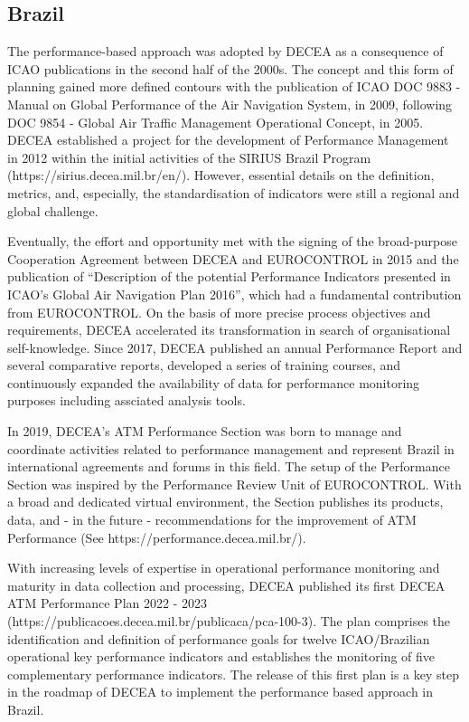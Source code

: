 \documentclass[
  a4paper,
  DIV=11,
  numbers=noendperiod]{scrreprt}
\begin{document}
\hypertarget{brazil}{%
\subsection{Brazil}\label{brazil}}

The performance-based approach was adopted by DECEA as a consequence of
ICAO publications in the second half of the 2000s. The concept and this
form of planning gained more defined contours with the publication of
ICAO DOC 9883 - Manual on Global Performance of the Air Navigation
System, in 2009, following DOC 9854 - Global Air Traffic Management
Operational Concept, in 2005. DECEA established a project for the
development of Performance Management in 2012 within the initial
activities of the SIRIUS Brazil Program
(https://sirius.decea.mil.br/en/). However, essential details on the
definition, metrics, and, especially, the standardisation of indicators
were still a regional and global challenge.

Eventually, the effort and opportunity met with the signing of the
broad-purpose Cooperation Agreement between DECEA and EUROCONTROL in
2015 and the publication of ``Description of the potential Performance
Indicators presented in ICAO's Global Air Navigation Plan 2016'', which
had a fundamental contribution from EUROCONTROL. On the basis of more
precise process objectives and requirements, DECEA accelerated its
transformation in search of organisational self-knowledge. Since 2017,
DECEA published an annual Performance Report and several comparative
reports, developed a series of training courses, and continuously
expanded the availability of data for performance monitoring purposes
including assciated analysis tools.

In 2019, DECEA's ATM Performance Section was born to manage and
coordinate activities related to performance management and represent
Brazil in international agreements and forums in this field. The setup
of the Performance Section was inspired by the Performance Review Unit
of EUROCONTROL. With a broad and dedicated virtual environment, the
Section publishes its products, data, and - in the future -
recommendations for the improvement of ATM Performance (See
https://performance.decea.mil.br/).

With increasing levels of expertise in operational performance
monitoring and maturity in data collection and processing, DECEA
published its first DECEA ATM Performance Plan 2022 - 2023
(https://publicacoes.decea.mil.br/publicaca/pca-100-3). The plan
comprises the identification and definition of performance goals for
twelve ICAO/Brazilian operational key performance indicators and
establishes the monitoring of five complementary performance indicators.
The release of this first plan is a key step in the roadmap of DECEA to
implement the performance based approach in Brazil.
\end{document}
